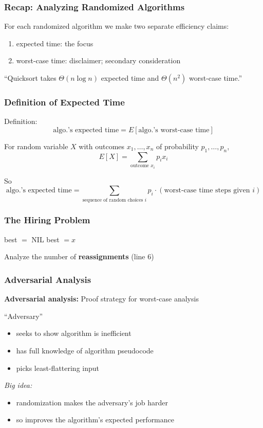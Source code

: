 \documentclass[10pt]{beamer}
\begin{document}
\begin{frame} \frametitle{Recap: Analyzing Randomized Algorithms}
  For each randomized algorithm we make two separate efficiency claims:
  \begin{enumerate}
    \item expected time: the focus
    \item worst-case time: disclaimer; secondary consideration
  \end{enumerate}
  \vspace{12pt}

  ``Quicksort takes $\Theta(n \log n)$ expected time and $\Theta(n^2)$ worst-case time.''
\end{frame}

\begin{frame} \frametitle{Definition of Expected Time}
  Definition: 
  \[ \text{algo.'s expected time} = E[\text{algo.'s worst-case time}] \]

  For random variable $X$ with outcomes $x_1, \ldots, x_n$ of probability $p_1, \ldots, p_n$,
  \[ E[X] = \sum_{\text{outcome $x_i$}} p_i x_i \]

  So
  \[ \text{algo.'s expected time} = \sum_{\text{sequence of random choices $i$}} p_i \cdot (\text{worst-case time steps given } i) \]

\end{frame}

\begin{frame} \frametitle{The Hiring Problem}
  {\footnotesize
  \begin{algorithmic}[1]
    \State best $ = $ NIL
        \State best $= x$
      \EndIf
    \EndFor
    \State {}
    \EndFunction
  \end{algorithmic}
  }
  \vspace{24pt}

  Analyze the number of \textbf{reassignments} (line 6)
\end{frame}

\begin{frame} \frametitle{Adversarial Analysis}
  \textbf{Adversarial analysis:} Proof strategy for worst-case analysis

  ``Adversary''
  \begin{itemize}
    \item seeks to show algorithm is inefficient
    \item has full knowledge of algorithm pseudocode
    \item picks least-flattering input
  \end{itemize}
  \vspace{12pt}

  \emph{Big idea:}
  \begin{itemize}
    \item randomization makes the adversary's job harder
    \item so improves the algorithm's expected performance
  \end{itemize}
\end{frame}
\end{document}
